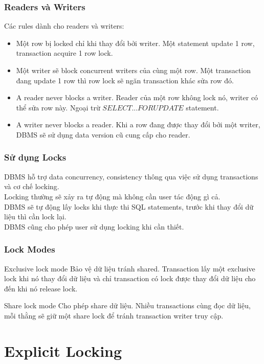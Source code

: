 \documentclass[xcolor={table, dvipsnames}]{beamer}
\begin{document}
\begin{frame}
\frametitle{Readers và Writers}
Các rules dành cho readers và writers:
\begin{itemize}
\item Một row bị locked chỉ khi thay đổi bởi writer. Một statement update 1 row, transaction acquire 1 row lock.
\item Một writer sẽ block concurrent writers của cùng một row. Một transaction đang update 1 row thì row lock sẽ ngăn transaction khác sửa row đó.
\item A reader never blocks a writer. Reader của một row không lock nó, writer có thể sửa row này. Ngoại trừ $SELECT ... FOR UPDATE$ statement.
\item A writer never blocks a reader. Khi a row đang được thay đổi bởi một writer, DBMS sẽ sử dụng data version cũ cung cấp cho reader.
\end{itemize}
\end{frame}

\begin{frame}
\frametitle{Sử dụng Locks}
DBMS hỗ trợ data concurrency, consistency thông qua việc sử dụng transactions và cơ chế locking.\\
Locking thường sẽ xảy ra tự động mà không cần user tác động gì cả.\\
DBMS sẽ tự động lấy locks khi thực thi SQL statements, trước khi thay đổi dữ liệu thì cần lock lại.\\
DBMS cũng cho phép user sử dụng locking khi cần thiết.\\
\end{frame}

\begin{frame}
\frametitle{Lock Modes}
\begin{block}{Exclusive lock mode}
Bảo vệ dữ liệu tránh shared. Transaction lấy một exclusive lock khi nó thay đổi dữ liệu và chỉ transaction có lock được thay đổi dữ liệu cho đến khi nó release lock. 
\end{block}
\pause
\begin{block}{Share lock mode}
Cho phép share dữ liệu. Nhiều transactions cùng đọc dữ liệu, mỗi thằng sẽ giữ một share lock để tránh transaction writer truy cập.
\end{block}
\end{frame}

\section{Explicit Locking}
\end{document}
